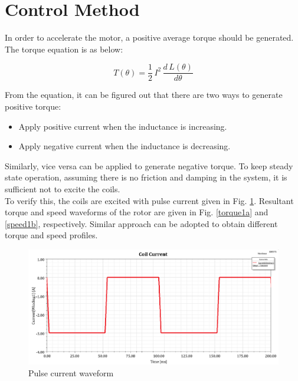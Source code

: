 \documentclass{reportClass}
\begin{document}
\section{Control Method}

In order to accelerate the motor, a positive average torque should be generated. The torque equation is as below:


$$
T(\theta) = \frac{1}{2}\,I^2\,\frac{d\,L(\theta)}{d\theta}
$$

From the equation, it can be figured out that there are two ways to generate positive torque:

\begin{itemize}
\item Apply positive current when the inductance is increasing.
\item Apply negative current when the inductance is decreasing.
\end{itemize}

Similarly, vice versa can be applied to generate negative torque. To keep steady state operation, assuming there is no friction and damping in the system, it is sufficient not to excite the coils.\\

To verify this, the coils are excited with pulse current given in Fig. \ref{fig:pulse}. Resultant torque and speed waveforms of the rotor are given in Fig. \ref{torque1a} and \ref{speed1b}, respectively. Similar approach can be adopted to obtain different torque and speed profiles. \\

\begin{figure}[h!]
\centering
\includegraphics[width=0.75\linewidth]{part4_coil_current.png}
\caption{Pulse current waveform}
\label{fig:pulse}
\end{figure}
\end{document}
